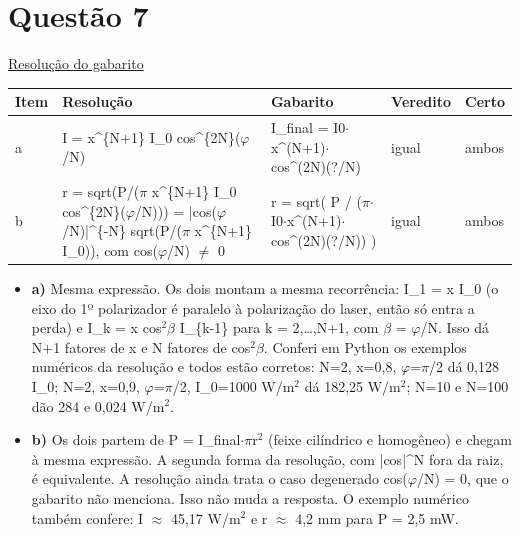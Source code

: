 \documentclass{article}%
\begin{document}
\section*{Questão 7}%
\href{https://poliedroresolve.sistemapoliedro.com.br/vestibulares/ita/2026/ita-2-fase-dia-3-30-10-2025-2-fase-dia-3/dissertativa-7-fisica-2-fase-dia-3-ita-2026}{Resolução do gabarito}\par\smallskip%
\begin{longtable}{@{}p{} p{} p{} p{} p{}@{}}\toprule Item & Resolução & Gabarito & Veredito & Certo \\ \midrule
a & I = x\^{}\{N+1\} I\_0 cos\^{}\{2N\}($\varphi$/N) & I\_final = I0$\cdot$x\^{}(N+1)$\cdot$cos\^{}(2N)(?/N) & igual & ambos \\
b & r = sqrt(P/($\pi$ x\^{}\{N+1\} I\_0 cos\^{}\{2N\}($\varphi$/N))) = |cos($\varphi$/N)|\^{}\{{-}N\} sqrt(P/($\pi$ x\^{}\{N+1\} I\_0)), com cos($\varphi$/N) $\neq$ 0 & r = sqrt( P / ($\pi$$\cdot$I0$\cdot$x\^{}(N+1)$\cdot$cos\^{}(2N)(?/N)) ) & igual & ambos \\
\bottomrule\end{longtable}%
\begin{itemize}%
\item%
\textbf{a)} Mesma expressão. Os dois montam a mesma recorrência: I\_1 = x I\_0 (o eixo do 1º polarizador é paralelo à polarização do laser, então só entra a perda) e I\_k = x cos$^2$$\beta$ I\_\{k{-}1\} para k = 2,\ldots{},N+1, com $\beta$ = $\varphi$/N. Isso dá N+1 fatores de x e N fatores de cos$^2$$\beta$. Conferi em Python os exemplos numéricos da resolução e todos estão corretos: N=2, x=0,8, $\varphi$=$\pi$/2 dá 0,128 I\_0; N=2, x=0,9, $\varphi$=$\pi$/2, I\_0=1000 W/m$^2$ dá 182,25 W/m$^2$; N=10 e N=100 dão 284 e 0,024 W/m$^2$.%
\item%
\textbf{b)} Os dois partem de P = I\_final$\cdot$$\pi$r$^2$ (feixe cilíndrico e homogêneo) e chegam à mesma expressão. A segunda forma da resolução, com |cos|\^{}N fora da raiz, é equivalente. A resolução ainda trata o caso degenerado cos($\varphi$/N) = 0, que o gabarito não menciona. Isso não muda a resposta. O exemplo numérico também confere: I $\approx$ 45,17 W/m$^2$ e r $\approx$ 4,2 mm para P = 2,5 mW.%
\end{itemize}%
\end{document}
